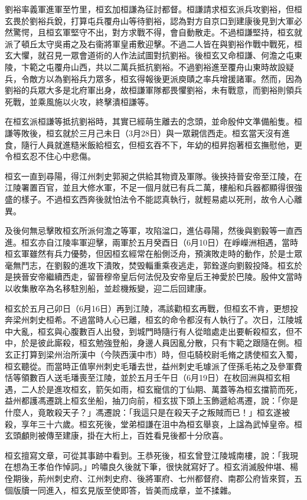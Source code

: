 劉裕率義軍進軍至竹里，桓玄加桓謙為征討都督。桓謙請求桓玄派兵攻劉裕，但桓玄畏於劉裕兵銳，打算屯兵覆舟山等待劉裕，認為對方自京口到建康後見到大軍必然驚愕，且桓玄軍堅守不出，對方求戰不得，會自動散走。不過桓謙堅持，桓玄就派了頓丘太守吳甫之及右衞將軍皇甫敷迎擊。不過二人皆在與劉裕作戰中戰死，桓玄大懼，就召見一眾會道術的人作法試圖對抗劉裕。後桓玄又命桓謙、何澹之屯東陵，卞範之屯覆舟山西，共以二萬兵抵抗劉裕。不過劉裕進至覆舟山東時故設疑兵，令敵方以為劉裕兵力眾多，桓玄得報後更派庾賾之率兵增援諸軍。然而，因為劉裕的兵眾大多是北府軍出身，故桓謙軍隊都畏懼劉裕，未有戰意，而劉裕則領兵死戰，並乘風施以火攻，終擊潰桓謙等。

在桓玄派桓謙等抵抗劉裕時，其實已經萌生離去的念頭，並命殷仲文準備船隻。桓謙等敗後，桓玄就於三月己未日（3月28日）與一眾親信西走。桓玄當天沒有進食，隨行人員就進糙米飯給桓玄，但桓玄吞不下，年幼的桓昇抱著桓玄撫慰他，更令桓玄忍不住心中悲傷。

桓玄一直到尋陽，得江州刺史郭昶之供給其物資及軍隊。後挾持晉安帝至江陵，在江陵署置百官，並且大修水軍，不足一個月就已有兵二萬，樓船和兵器都顯得很強盛的樣子。不過桓玄西奔後就怕法令不能認真執行，就輕易處以死刑，故令人心離異。

及後何無忌擊敗桓玄所派何澹之等軍，攻陷湓口，進佔尋陽，然後與劉毅等一直西進。桓玄亦自江陵率軍迎擊，兩軍於五月癸酉日（6月10日）在崢嶸洲相遇，當時桓玄軍雖然有兵力優勢，但因桓玄經常在船側泛舟，預演敗走時的動作，於是士眾毫無鬥志，在劉毅的進攻下潰敗，焚毁輜重乘夜逃走，郭銓遂向劉毅投降。桓玄於是挾晉安帝繼續西走，留晉穆帝皇后何法倪及安帝皇后王神愛於巴陵。殷仲文當時以收集散卒為名移駐別船，並趁機叛變，迎二后回建康。

桓玄於五月己卯日（6月16日）再到江陵，馮該勸桓玄再戰，但桓玄不肯，更想投奔梁州刺史桓希。不過當時人心已離，桓玄的命令都沒有人執行了。次日，江陵城中大亂，桓玄與心腹數百人出發，到城門時隨行有人從暗處走出要斬殺桓玄，但不中，於是彼此廝殺，桓玄勉強登船，身邊人員因亂分散，只有卞範之跟隨在側。桓玄正打算到梁州治所漢中（今陝西漢中市）時，但屯騎校尉毛脩之誘使桓玄入蜀，桓玄聽從。而當時正值寧州刺史毛璠去世，益州刺史毛璩派了侄孫毛祐之及參軍費恬等領數百人送毛璠喪至江陵，並於五月壬午日（6月19日）在枚回洲與桓玄相遇，二人於是進攻桓玄，箭矢如雨，桓玄寵信的丁仙期、萬蓋等為桓玄擋箭而死，益州都護馮遷跳上桓玄坐船，抽刀向前，桓玄拔下頭上玉飾遞給馮遷，說：「你是什麼人，竟敢殺天子？」馮遷說：「我這只是在殺天子之叛賊而已！」桓玄遂被殺，享年三十六歲。桓玄死後，堂弟桓謙在沮中為桓玄舉哀，上諡為武悼皇帝。桓玄頭顱則被傳至建康，掛在大桁上，百姓看見後都十分欣喜。

桓玄擅寫文章，可從其事跡中看到。王恭死後，桓玄曾登江陵城南樓，說：「我現在想為王孝伯作悼詞。」吟嘯良久後就下筆，很快就寫好了。桓玄消滅殷仲堪、楊佺期後，荊州刺史府、江州刺史府、後將軍府、七州都督府、南郡公府皆來賀，五個版牘一同進入，桓玄見版至使即答，皆美而成章，並不揉雜。

